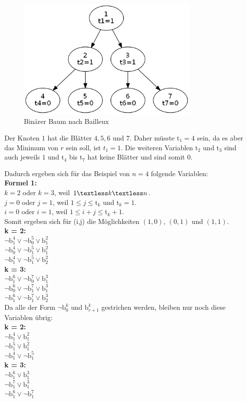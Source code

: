 \documentclass[a4,abstract=on]{scrartcl}
\begin{document}
\begin{figure}[H]
\centering
\includegraphics[width=9cm]{bailleux.png}
\caption{Binärer Baum nach Bailleux}
\label{fig:baum}
\end{figure}

Der Knoten $1$ hat die Blätter $4,5,6$ und $7$. Daher müsste $\text{t}_1 = 4$ sein, da es aber das Minimum von $r$ sein soll, ist $t_1=1$. Die weiteren Variablen $\text{t}_2$ und $\text{t}_3$ sind auch jeweils $1$ und $\text{t}_4$ bis $\text{t}_7$ hat keine Blätter und sind somit $0$.

Dadurch ergeben sich für das Beispiel von $n=4$ folgende Variablen:\\
\textbf{Formel 1:}\\
$k=2$ oder $k=3$, weil $1 \textless k \textless n$.\\
$j=0$ oder $j=1$, weil $1 \leq j \leq \text{t}_k$ und $\text{t}_k = 1$.\\
$i=0$ oder $i=1$, weil $1\leq i+j \leq \text{t}_{k}+1$.\\
Somit ergeben sich für (i,j) die Möglichkeiten $(1,0)$, $(0,1)$ und $(1,1)$.\\
\textbf{k = 2:}\\
$\neg \text{b}_1^4 \vee \neg \text{b}_0^5 \vee \text{b}_1^2$\\
$\neg \text{b}_0^4 \vee \neg \text{b}_1^5 \vee \text{b}_1^2$\\
$\neg \text{b}_1^4 \vee \neg \text{b}_1^5 \vee \text{b}_2^2$\\
\textbf{k = 3:}\\
$\neg \text{b}_1^6 \vee \neg \text{b}_0^7 \vee \text{b}_1^3$\\
$\neg \text{b}_0^6 \vee \neg \text{b}_1^7 \vee \text{b}_1^3$\\
$\neg \text{b}_1^6 \vee \neg \text{b}_1^7 \vee \text{b}_2^3$\\

Da alle der Form $\neg \text{b}_0^k$ und $\text{b}_{r+1}^k$  gestrichen werden, bleiben nur noch diese Variablen übrig:\\
\textbf{k = 2:}\\
$\neg \text{b}_1^4  \vee \text{b}_1^2$\\
$\neg \text{b}_1^5 \vee \text{b}_1^2$\\
$\neg \text{b}_1^4 \vee \neg \text{b}_1^5$\\
\textbf{k = 3:}\\
$\neg \text{b}_1^6 \vee \text{b}_1^3$\\
$\neg \text{b}_1^7 \vee \text{b}_1^3$\\
$\neg \text{b}_1^6 \vee \neg \text{b}_1^7 $\\
\end{document}
